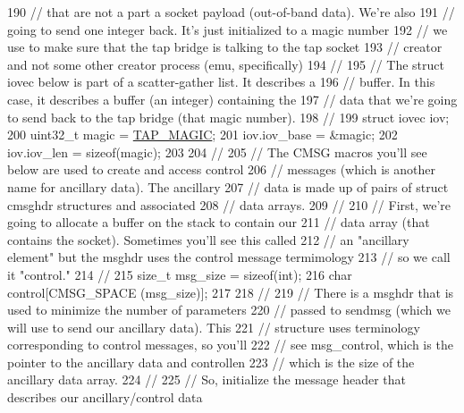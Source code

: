 \begin{DoxyCode}
190   \textcolor{comment}{// that are not a part a socket payload (out-of-band data).  We're also }
191   \textcolor{comment}{// going to send one integer back.  It's just initialized to a magic number}
192   \textcolor{comment}{// we use to make sure that the tap bridge is talking to the tap socket }
193   \textcolor{comment}{// creator and not some other creator process (emu, specifically)}
194   \textcolor{comment}{//}
195   \textcolor{comment}{// The struct iovec below is part of a scatter-gather list.  It describes a}
196   \textcolor{comment}{// buffer.  In this case, it describes a buffer (an integer) containing the}
197   \textcolor{comment}{// data that we're going to send back to the tap bridge (that magic number).}
198   \textcolor{comment}{// }
199   \textcolor{keyword}{struct }iovec iov;
200   uint32\_t magic = \hyperlink{tap-creator_8cc_af9ac95d538205da6013d79a63fee2bd7}{TAP\_MAGIC};
201   iov.iov\_base = &magic;
202   iov.iov\_len = \textcolor{keyword}{sizeof}(magic);
203 
204   \textcolor{comment}{//}
205   \textcolor{comment}{// The CMSG macros you'll see below are used to create and access control }
206   \textcolor{comment}{// messages (which is another name for ancillary data).  The ancillary }
207   \textcolor{comment}{// data is made up of pairs of struct cmsghdr structures and associated}
208   \textcolor{comment}{// data arrays.}
209   \textcolor{comment}{// }
210   \textcolor{comment}{// First, we're going to allocate a buffer on the stack to contain our }
211   \textcolor{comment}{// data array (that contains the socket).  Sometimes you'll see this called}
212   \textcolor{comment}{// an "ancillary element" but the msghdr uses the control message termimology}
213   \textcolor{comment}{// so we call it "control."}
214   \textcolor{comment}{//}
215   \textcolor{keywordtype}{size\_t} msg\_size = \textcolor{keyword}{sizeof}(int);
216   \textcolor{keywordtype}{char} control[CMSG\_SPACE (msg\_size)];
217 
218   \textcolor{comment}{//}
219   \textcolor{comment}{// There is a msghdr that is used to minimize the number of parameters}
220   \textcolor{comment}{// passed to sendmsg (which we will use to send our ancillary data).  This}
221   \textcolor{comment}{// structure uses terminology corresponding to control messages, so you'll}
222   \textcolor{comment}{// see msg\_control, which is the pointer to the ancillary data and controllen}
223   \textcolor{comment}{// which is the size of the ancillary data array.}
224   \textcolor{comment}{//}
225   \textcolor{comment}{// So, initialize the message header that describes our ancillary/control data}

\end{DoxyCode}
